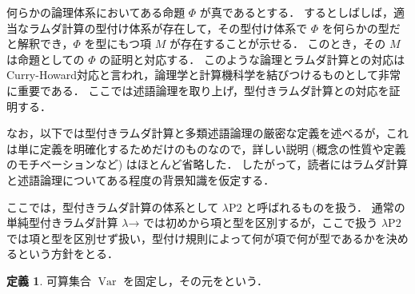 \documentclass[./main]{subfiles}
\begin{document}
\newcommand{\lam}{\lambda}
\newcommand{\lamG}{\mathrm{G}}
\newcommand{\lamI}{\mathrm{I}}
\newcommand{\lamP}{\mathrm{P}}
\newcommand{\bto}{\mathbin{\to}}
\newcommand{\cl}{\mathpunct{:}}
\newcommand{\ocl}{\mathord{:}}
\newcommand{\op}[1]{\mathop{\mathrm{#1}}\nolimits}
\newcommand{\comb}[1]{\mathbf{#1}}
\newcommand{\combop}[1]{\mathop{\mathbf{#1}}\nolimits}
\newcommand{\typstar}{\mathord{\star}}
\newcommand{\typsq}{\mathord{\square}}
\newcommand{\textem}[1]{\textbf{\textgt{#1}}}
\newcommand{\mathscr}[1]{\mathcal{#1}}
\newcommand{\fl}[1]{}
\newcommand{\fcdots}{\mathord{\cdots}}
\newcommand{\ats}{\,}
\newcommand{\coloneqq}{\mathrel{:=}}
\newcommand{\fwland}{\,\mathbin{\text{\textsc{and}}}\,}
\newcommand{\fwlor}{\,\mathbin{\text{\textsc{or}}}\,}
\newcommand{\fLongleftrightarrow}{\,\Longleftrightarrow\,}
\newcommand{\fLongrightarrow}{\,\Longrightarrow\,}
\newcommand{\llbracket}{[\![}
\newcommand{\rrbracket}{]\!]}
\theoremstyle{definition}
\newtheorem{ziphiltheo}{定理}
\newtheorem{ziphildefi}[ziphiltheo]{定義}
\newtheorem{ziphilprop}[ziphiltheo]{命題}





何らかの論理体系においてある命題 $ \varPhi $ が真であるとする．
するとしばしば，適当なラムダ計算の型付け体系が存在して，その型付け体系で $ \varPhi $ を何らかの型だと解釈でき，$ \varPhi $ を型にもつ項 $ M $ が存在することが示せる．
このとき，その $ M $ は命題としての $ \varPhi $ の証明と対応する．
このような論理とラムダ計算との対応はCurry-Howard対応と言われ，論理学と計算機科学を結びつけるものとして非常に重要である．
ここでは述語論理を取り上げ，型付きラムダ計算との対応を証明する．

なお，以下では型付きラムダ計算と多類述語論理の厳密な定義を述べるが，これは単に定義を明確化するためだけのものなので，詳しい説明 (概念の性質や定義のモチベーションなど) はほとんど省略した．
したがって，読者にはラムダ計算と述語論理についてある程度の背景知識を仮定する．


ここでは，型付きラムダ計算の体系として $ \lam \mathrm{P2} $ と呼ばれるものを扱う．
通常の単純型付きラムダ計算 $ \lam \mathord{\to} $ では初めから項と型を区別するが，ここで扱う $ \lam \mathrm{P2} $ では項と型を区別せず扱い，型付け規則によって何が項で何が型であるかを決めるという方針をとる．

\begin{ziphildefi}
可算集合 $ \op{Var} $ を固定し，その元を\textem{変項\fl{variable}}という．
\end{ziphildefi}
\end{document}
